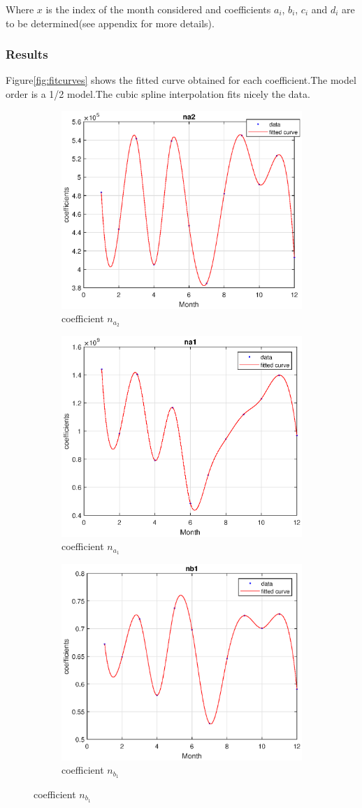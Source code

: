 \documentclass[a4paper,12pt]{report}
\numberwithin{equation}{section}
\begin{document}
\noindent
Where $x$ is the index of the month considered and coefficients $a_{i}$, $b_{i}$, $c_{i}$ and $d_{i}$ are to be determined(see appendix for more details).

\subsubsection{Results}
Figure\ref{fig:fitcurves} shows the fitted curve obtained for each coefficient.The model order is a 1/2 model.The cubic spline interpolation fits nicely the data.

\begin{figure}[H]
\centering
\begin{subfigure}{\textwidth}
\centering
  \includegraphics[width=.6\linewidth]{coeffna2.eps}
  \caption{coefficient $n_{a_{2}}$}
  \label{fig:coeffna2}
\end{subfigure}
\begin{subfigure}{\textwidth}
\centering
  \includegraphics[width=.6\linewidth]{coeffna1.eps}
  \caption{coefficient $n_{a_{1}}$}
  \label{fig:coeffna1}
\end{subfigure}
\begin{subfigure}{\textwidth}
  \centering
  \includegraphics[width=.6\linewidth]{coeffnb1.eps}
  \caption{coefficient $n_{b_{1}}$}
  \label{fig:coeffnb1}
\end{subfigure}
\end{figure}
\end{document}
